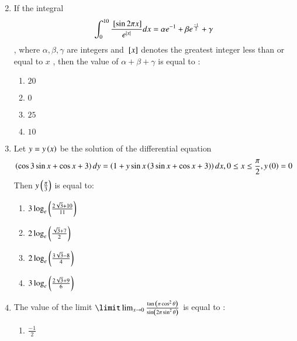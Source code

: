 \documentclass[journal,12pt,onecolumn]{IEEEtran}
\theoremstyle{remark}
\begin{document}
\begin{enumerate}
\begin{multicols}{2}
\begin{enumerate}
       \end{enumerate}
   \end{multicols}
   \item If the integral
   \begin{align}    
   \int_0^{10} \frac{{}\left[\sin{2\pi x}\right]}{e^{\left\vert x\right\vert}} dx = \alpha{e^{-1}} + \beta{e^{\frac{-1}{2}}} + \gamma 
   \end{align}
   , where $\alpha  , \beta , \gamma$ are integers and ${}\left[x\right]$ denotes the greatest integer less than or equal to $x$ , then the value of $\alpha + \beta + \gamma$ is equal to : 
   \begin{multicols}{2}
       \begin{enumerate}
           \item $20$
           \item $0$\\
           \item $25$
           \item $10$
       \end{enumerate}
   \end{multicols}
   \item Let $y = y\left(x\right)$ be the solution of the differential equation
   \begin{align}
   \left(\cos{3\sin{x} + \cos{x} + 3 }\right)dy = \left(1 + y\sin{x}\left(3\sin{x}+ \cos{x} +3\right)\right)dx , 0 \leq x \leq \frac{\pi}{2}, y\left(0\right)=0
   \end{align}
   Then $y\left(\frac{\pi}{3}\right)$ is equal to:
   \begin{multicols}{2}
       \begin{enumerate}
           \item $3\log_e \left(\frac{2\sqrt{3}+10}{11}\right)$\\
           \item $2\log_e \left(\frac{\sqrt{3}+7}{2}\right)$
           \item $2\log_e \left(\frac{3\sqrt{3}-8}{4}\right)$\\
           \item $3\log_e \left(\frac{2\sqrt{3}+9}{6}\right)$
       \end{enumerate}
   \end{multicols}
   \item The value of the limit $\limit\lim_{x \to 0} \frac{\tan{\brak{\pi \cos^2{\theta}}}}{\sin \brak{2 \pi \sin^2{\theta}}}$ is equal to :
   \begin{multicols}{2}
   \begin{enumerate}
       \item $\frac{-1}{2}$\\

\end{enumerate}
\end{multicols}
\end{enumerate}
\end{document}
